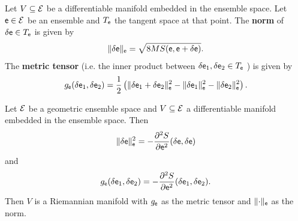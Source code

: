 \begin{defn}
	Let $V \subseteq \mathcal{E}$ be a differentiable manifold embedded in the ensemble space. Let $\mathsf{e} \in \mathcal{E}$ be an ensemble and $T_{\mathsf{e}}$ the tangent space at that point. The \textbf{norm} of $\delta \mathsf{e} \in T_{\mathsf{e}}$ is given by
	$$ \lVert \delta \mathsf{e} \rVert_{\mathsf{e}} = \sqrt{ 8 MS(\mathsf{e}, \mathsf{e} + \delta \mathsf{e}) }.$$
	The \textbf{metric tensor} (i.e. the inner product between $\delta \mathsf{e}_1 , \delta \mathsf{e}_2 \in T_{\mathsf{e}}$ ) is given by
	$$ g_{\mathsf{e}}( \delta \mathsf{e}_1, \delta \mathsf{e}_2 ) = \frac{1}{2} \left( \lVert \delta \mathsf{e}_1 + \delta \mathsf{e}_2 \rVert_{\mathsf{e}}^2 - \lVert \delta \mathsf{e}_1 \rVert_{\mathsf{e}}^2 - \lVert \delta \mathsf{e}_2 \rVert_{\mathsf{e}}^2 \right).$$
\end{defn}

\begin{thrm}
	Let $\mathcal{E}$ be a geometric ensemble space and $V \subseteq \mathcal{E}$ a differentiable manifold embedded in the ensemble space. Then
	$$ \lVert \delta \mathsf{e} \rVert_{\mathsf{e}}^2 = - \frac{\partial^2 S}{\partial \mathsf{e}^2}(\delta \mathsf{e} , \delta \mathsf{e}) $$
	and 
	$$ g_{\mathsf{e}}( \delta \mathsf{e}_1, \delta \mathsf{e}_2 ) = - \frac{\partial^2 S}{\partial \mathsf{e} ^2}( \delta \mathsf{e}_1, \delta \mathsf{e}_2 ).$$
	Then $V$ is a Riemannian manifold with $g_{\mathsf{e}}$ as the metric tensor and $\lVert \cdot \rVert_{\mathsf{e}}$ as the norm.
\end{thrm}

